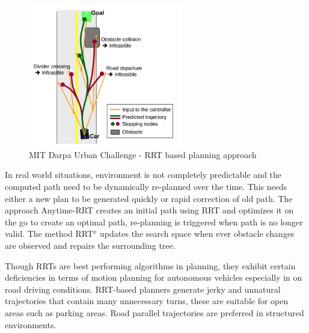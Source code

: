 \begin{figure}
	\centering
	\includegraphics[width=0.6\textwidth]{Images/related_work/mit_urban_planning.png}
	\caption{MIT Darpa Urban Challenge - RRT based planning approach}
	\label{mit_rrt_fig}
\end{figure} 

In real world situations, environment is not completely predictable and the computed path need to be dynamically re-planned over the time. This needs either a new plan to be generated quickly or rapid correction of old path. The approach Anytime-RRT \cite{anytimerrt} creates an initial path using RRT and optimizes it on the go to create an optimal path, re-planning is triggered when path is no longer valid. The method RRT$^x$ \cite{rrtx} updates the search space when ever obstacle changes are observed and repairs the surrounding tree. 

Though RRTs are best performing algorithms in planning, they exhibit certain deficiencies in terms of motion planning for autonomous vehicles especially in on road driving conditions.  RRT-based planners generate jerky and unnatural trajectories that contain many unnecessary turns\cite{improved_rrt}, these are suitable for open areas such as parking areas. Road parallel trajectories are preferred in structured environments. 

